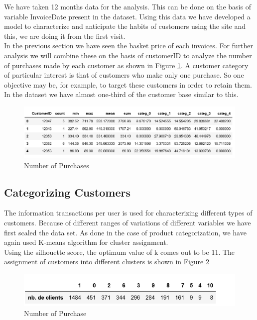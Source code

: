 We have taken 12 months data for the analysis. This can be done on the basis of variable InvoiceDate present in the dataset. Using this data we have developed a model to characterize and anticipate the habits of customers using the site and this, we are doing it from the first visit.\\

In the previous section we have seen the basket price of each invoices. For further analysis we will combine these on the basis of customerID to analyze the number of purchases made by each customer as shown in Figure \ref{4.2}. A customer category of particular interest is that of customers who make only one purchase. So one objective may be, for example, to target these customers in order to retain them. In the dataset we have almost one-third of the customer base similar to this.

\begin{figure}
\caption{Number of Purchases}
\label{4.2}
\centering
\includegraphics[width=\columnwidth]{images/4_2.PNG}
\end{figure}


\subsection{Categorizing Customers}

The information transactions per user is used for characterizing different types of customers. Because of different ranges of variations of different variables we have first scaled the data set. As done in the case of product categorization, we have again used K-means algorithm for cluster assignment.\\

Using the silhouette score, the optimum value of k comes out to be 11. The assignment of customers into different clusters is shown in Figure \ref{4.3}

\begin{figure}
\caption{Number of Purchase}
\label{4.3}
\centering
\includegraphics[width=\columnwidth]{images/4_3.PNG}
\end{figure}

